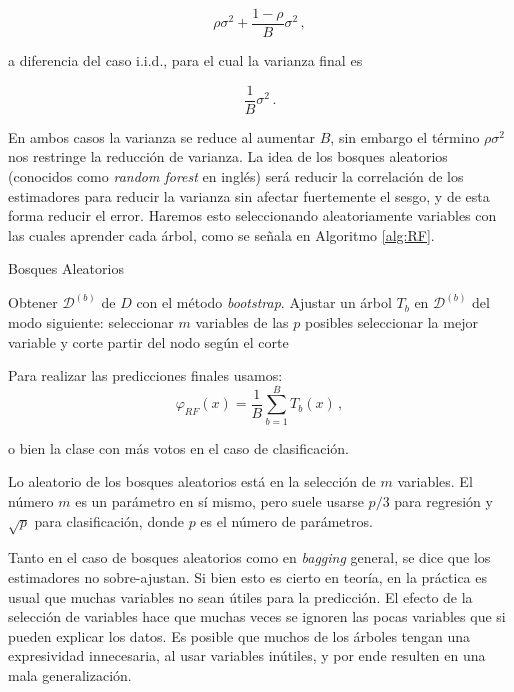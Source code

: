 $$ \rho \sigma^2 + \frac{1 - \rho}{B} \sigma^2 \,, $$

a diferencia del caso i.i.d., para el cual la varianza final es

$$ \frac{1}{B}\sigma^2 \,. $$

En ambos casos la varianza se reduce al aumentar $B$, sin embargo el término $\rho \sigma^2$ nos restringe la reducción de varianza. La idea de los bosques aleatorios (conocidos como \textit{random forest} en inglés) será reducir la correlación de los estimadores para reducir la varianza sin afectar fuertemente el sesgo, y de esta forma reducir el error. Haremos esto seleccionando aleatoriamente variables con las cuales aprender cada árbol, como se señala en Algoritmo \ref{alg:RF}.

\begin{algorithm}[H]
  \caption{Bosques Aleatorios
    \label{alg:RF}}
  \begin{algorithmic}[1]
    \State Obtener $\mathcal{D}^{(b)}$ de $D$ con el método \textit{bootstrap}.
    \State Ajustar un árbol $T_b$ en $\mathcal{D}^{(b)}$ del modo siguiente:
            \State seleccionar $m$ variables de las $p$ posibles
            \State seleccionar la mejor variable y corte
            \State partir del nodo según el corte
        \EndFor
    \EndFor
    \EndFunction
  \end{algorithmic}
\end{algorithm}

Para realizar las predicciones finales usamos:
$$ \varphi_{RF}(x) = \frac{1}{B} \sum^B_{b=1} T_b (x) \,, $$

o bien la clase con más votos en el caso de clasificación.

Lo aleatorio de los bosques aleatorios está en la selección de $m$ variables. El número $m$ es un parámetro en sí mismo, pero suele usarse $p/3$ para regresión y $\sqrt{p}$ para clasificación, donde $p$ es el número de parámetros.

Tanto en el caso de bosques aleatorios como en \textit{bagging} general, se dice que los estimadores no sobre-ajustan. Si bien esto es cierto en teoría, en la práctica es usual que muchas variables no sean útiles para la predicción. El efecto de la selección de variables hace que muchas veces se ignoren las pocas variables que si pueden explicar los datos. Es posible que muchos de los árboles tengan una expresividad innecesaria, al usar variables inútiles, y por ende resulten en una mala generalización.


